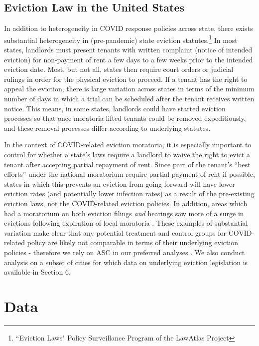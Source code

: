 \documentclass[12pt]{amsart}
\begin{document}
\subsection{Eviction Law in the United States}

In addition to heterogeneity in COVID response policies across state, there exists substantial heterogeneity in (pre-pandemic) state eviction statutes.\footnote{``Eviction Laws" Policy Surveillance Program of the LawAtlas Project} In most states, landlords must present tenants with written complaint (notice of intended eviction) for non-payment of rent a few days to a few weeks prior to the intended eviction date. Most, but not all, states then require court orders or judicial rulings in order for the physical eviction to proceed. If a tenant has the right to appeal the eviction, there is large variation across states in terms of the minimum number of days in which a trial can be scheduled after the tenant receives written notice. This means, in some states, landlords could have started eviction processes so that once moratoria lifted tenants could be removed expeditiously, and these removal processes differ according to underlying statutes.

In the context of COVID-related eviction moratoria, it is especially important to control for whether a state's laws require a landlord to waive the right to evict a tenant after accepting partial repayment of rent. Since part of the tenant's ``best efforts'' under the national moratorium require partial payment of rent if possible, states in which this prevents an eviction from going forward will have lower eviction rates (and potentially lower infection rates) as a result of the pre-existing eviction laws, not the COVID-related eviction policies. In addition, areas which had a moratorium on both eviction filings \textit{and} hearings saw more of a surge in evictions following expiration of local moratoria \cite{cowin2020measuring}. These examples of substantial variation make clear that any potential treatment and control groups for COVID-related policy are likely not comparable in terms of their underlying eviction policies - therefore we rely on ASC in our preferred analyses \cite{kreif2016examination}. We also conduct analysis on a subset of cities for which data on underlying eviction legislation is available in Section 6.  

\section{Data}
\end{document}
